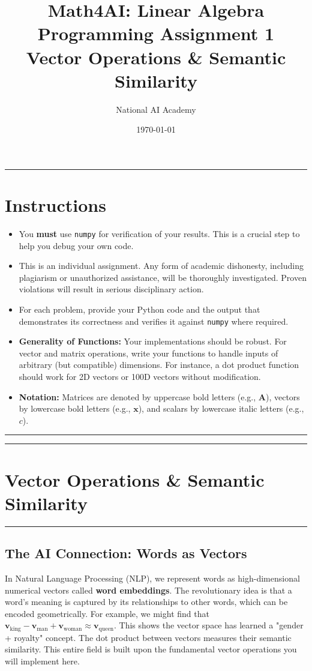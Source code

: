 \documentclass[12pt]{article}
\title{\textbf{Math4AI: Linear Algebra \\ Programming Assignment 1} \\ \large \vspace{5 mm}Vector Operations \& Semantic Similarity}
\author{National AI Academy}
\date{\today}
\begin{document}
\maketitle
\hrule

\section*{Instructions}

\begin{itemize}
    \item You \textbf{must} use \texttt{numpy} for verification of your results. This is a crucial step to help you debug your own code.
    \item  This is an individual assignment. Any form of academic dishonesty, including plagiarism or unauthorized assistance, will be thoroughly investigated. Proven violations will result in serious disciplinary action.
    \item For each problem, provide your Python code and the output that demonstrates its correctness and verifies it against \texttt{numpy} where required.
    \item \textbf{Generality of Functions:} Your implementations should be robust. For vector and matrix operations, write your functions to handle inputs of arbitrary (but compatible) dimensions. For instance, a dot product function should work for 2D vectors or 100D vectors without modification.
    \item \textbf{Notation:} Matrices are denoted by uppercase bold letters (e.g., $\mathbf{A}$), vectors by lowercase bold letters (e.g., $\mathbf{x}$), and scalars by lowercase italic letters (e.g., $c$).
\end{itemize}

\hrule\vspace{1em}

\newpage
\hrule
\section*{Vector Operations \& Semantic Similarity}
\hrule\vspace{0.5em}

\subsection*{The AI Connection: Words as Vectors}
In Natural Language Processing (NLP), we represent words as high-dimensional numerical vectors called \textbf{word embeddings}. The revolutionary idea is that a word's meaning is captured by its relationships to other words, which can be encoded geometrically. For example, we might find that $\mathbf{v}_{\text{king}} - \mathbf{v}_{\text{man}} + \mathbf{v}_{\text{woman}} \approx \mathbf{v}_{\text{queen}}$. This shows the vector space has learned a "gender + royalty" concept. The dot product between vectors measures their semantic similarity. This entire field is built upon the fundamental vector operations you will implement here.
\end{document}
